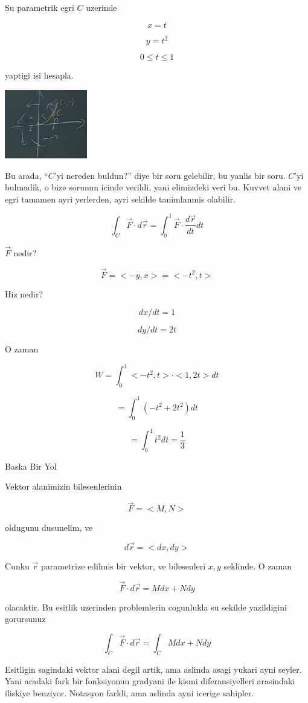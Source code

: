 \documentclass[12pt,fleqn]{article}
\begin{document}
Su parametrik egri $C$ uzerinde

\[ x = t  \]

\[ y = t^2 \]

\[ 0 \le t \le 1 \]

yaptigi isi hesapla. 

\includegraphics[height=3cm]{19_10.png}

Bu arada, ``$C$'yi nereden buldun?'' diye bir soru gelebilir, bu yanlis bir
soru. $C$'yi bulmadik, o bize sorunun icinde verildi, yani elimizdeki veri
bu. Kuvvet alani ve egri tamamen ayri yerlerden, ayri sekilde tanimlanmis
olabilir. 

\[ \int_C \vec{F} \cdot d\vec{r} 
= \int_{0}^{1} \vec{F} \cdot \frac{d\vec{r}}{dt} dt 
\]

$\vec{F}$ nedir? 

\[ \vec{F} = <-y,x> = <-t^2,t> \]

Hiz nedir? 

\[ dx/dt = 1 \]

\[ dy/dt = 2t \]

O zaman 

\[ W = \int_{0}^{1}  <-t^2,t>\cdot<1,2t>dt \]

\[ = \int_{0}^{1} (-t^2 + 2t^2)dt\]

\[ = \int_{0}^{1} t^2dt = \frac{1}{3} \]


Baska Bir Yol

Vektor alanimizin bilesenlerinin

\[ \vec{F} = <M,N> \]

oldugunu dusunelim, ve

\[ d\vec{r} = <dx, dy> \]

Cunku $\vec{r}$ parametrize edilmis bir vektor, ve bilesenleri $x,y$
seklinde. O zaman

\[  \vec{F} \cdot d\vec{r}  = M dx + N dy
\]

olacaktir. Bu esitlik uzerinden problemlerin cogunlukla su sekilde
yazildigini gorursunuz

\[  \int_C \vec{F} \cdot d\vec{r}  = \int_C M dx + N dy\]

Esitligin sagindaki vektor alani degil artik, ama aslinda asagi yukari ayni
seyler. Yani aradaki fark bir fonksiyonun gradyani ile kismi
diferansiyelleri arasindaki iliskiye benziyor. Notasyon farkli, ama aslinda
ayni icerige sahipler. 
\end{document}
